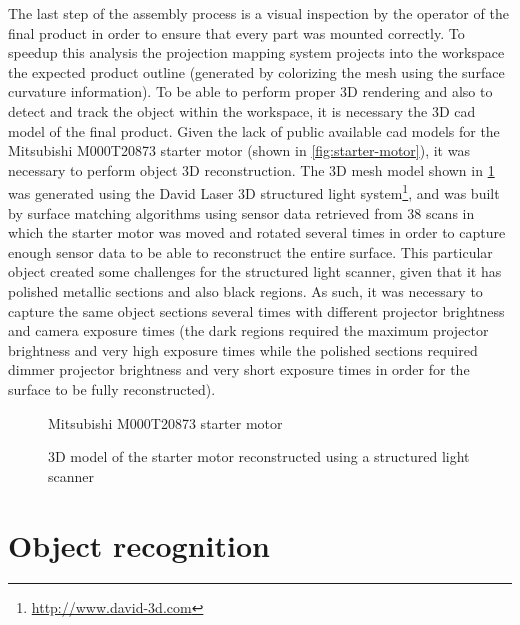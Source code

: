 The last step of the assembly process is a visual inspection by the operator of the final product in order to ensure that every part was mounted correctly. To speedup this analysis the projection mapping system projects into the workspace the expected product outline (generated by colorizing the mesh using the surface curvature information). To be able to perform proper 3D rendering and also to detect and track the object within the workspace, it is necessary the 3D \gls{cad} model of the final product. Given the lack of public available \gls{cad} models for the Mitsubishi M000T20873 starter motor (shown in \cref{fig:starter-motor}), it was necessary to perform object 3D reconstruction. The 3D mesh model shown in \cref{fig:object-reconstruction} was generated using the David Laser 3D structured light system\footnote{\url{http://www.david-3d.com}}, and was built by surface matching algorithms using sensor data retrieved from 38 scans in which the starter motor was moved and rotated several times in order to capture enough sensor data to be able to reconstruct the entire surface. This particular object created some challenges for the structured light scanner, given that it has polished metallic sections and also black regions. As such, it was necessary to capture the same object sections several times with different projector brightness and camera exposure times (the dark regions required the maximum projector brightness and very high exposure times while the polished sections required dimmer projector brightness and very short exposure times in order for the surface to be fully reconstructed).

\begin{figure}[H]
	\begin{floatrow}[2]
		{\caption{Mitsubishi M000T20873 starter motor}\label{fig:starter-motor}}
		{\caption{3D model of the starter motor reconstructed using a structured light scanner}\label{fig:object-reconstruction}}
	\end{floatrow}
\end{figure}



\section{Object recognition}

